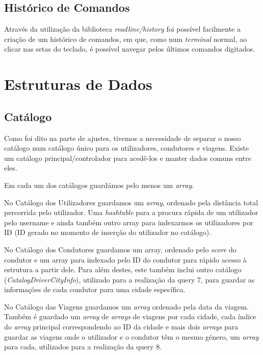 \documentclass{article}
\begin{document}
        \subsection{Histórico de Comandos}
            Através da utilização da biblioteca \emph{readline/history} foi possível
            facilmente a criação de um histórico de comandos, em que, como num \textit{terminal}
            normal, ao clicar nas setas do teclado, é possível navegar pelos últimos
            comandos digitados.
            
    \section{Estruturas de Dados}
        \subsection{Catálogo}
            Como foi dito na parte de ajustes, tivemos a necessidade de separar o nosso
            catálogo num catálogo único para os utilizadores, condutores e viagens.
            Existe um catálogo principal/controlador para acedê-los e manter dados comuns entre eles.

            Em cada um dos catálogos guardámos pelo menos um \textit{array}.
            
            No Catálogo dos Utilizadores guardamos um \textit{array}, ordenado pela distância total percorrida
            pelo utilizador. Uma \textit{hashtable} para a procura rápida de um utilizador pelo username e
            ainda também outro array para indexarmos os utilizadores por ID (ID gerado no
            momento de inserção do utilizador no catálogo).
			
            No Catálogo dos Condutores guardamos um array, ordenado pelo \emph{score} do condutor e
            um array para indexado pelo ID do condutor para rápido acesso à estrutura a partir dele.
            Para além destes, este também inclui outro catálogo (\textit{CatalogDriverCityInfo}), utilizado para a realização da query 7, 
            para guardar as informações de cada condutor para uma cidade 
            específica.
			
            No Catálogo das Viagens guardamos um \textit{array} ordenado pela data da viagem. 
            Também é guardado um \textit{array} de \textit{arrays} de viagens por cada cidade, cada índice
            do \textit{array} principal correspondendo ao ID da cidade e mais dois \textit{arrays} para guardar
            as viagens onde o utilizador e o condutor têm o mesmo género, um \textit{array} para cada,
            utilizados para a realização da query 8.
            
\end{document}
